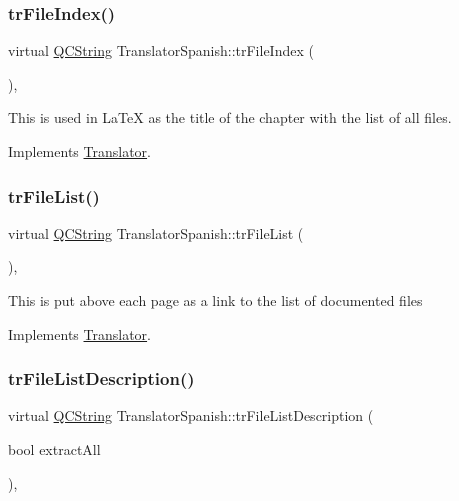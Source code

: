 \subsubsection{\texorpdfstring{trFileIndex()}{trFileIndex()}}
{\footnotesize\ttfamily virtual \mbox{\hyperlink{class_q_c_string}{Q\+C\+String}} Translator\+Spanish\+::tr\+File\+Index (\begin{DoxyParamCaption}{ }\end{DoxyParamCaption})\hspace{0.3cm}{\ttfamily [inline]}, {\ttfamily [virtual]}}

This is used in La\+TeX as the title of the chapter with the list of all files. 

Implements \mbox{\hyperlink{class_translator}{Translator}}.

\mbox{\label{class_translator_spanish_a5a4e87f70b9c92aa9da6fd2929a29b25}} 
\subsubsection{\texorpdfstring{trFileList()}{trFileList()}}
{\footnotesize\ttfamily virtual \mbox{\hyperlink{class_q_c_string}{Q\+C\+String}} Translator\+Spanish\+::tr\+File\+List (\begin{DoxyParamCaption}{ }\end{DoxyParamCaption})\hspace{0.3cm}{\ttfamily [inline]}, {\ttfamily [virtual]}}

This is put above each page as a link to the list of documented files 

Implements \mbox{\hyperlink{class_translator}{Translator}}.

\mbox{\label{class_translator_spanish_aaa8d3f0e2a36d002664bd17bbeda3318}} 
\subsubsection{\texorpdfstring{trFileListDescription()}{trFileListDescription()}}
{\footnotesize\ttfamily virtual \mbox{\hyperlink{class_q_c_string}{Q\+C\+String}} Translator\+Spanish\+::tr\+File\+List\+Description (\begin{DoxyParamCaption}\item[{bool}]{extract\+All }\end{DoxyParamCaption})\hspace{0.3cm}{\ttfamily [inline]}, {\ttfamily [virtual]}}

